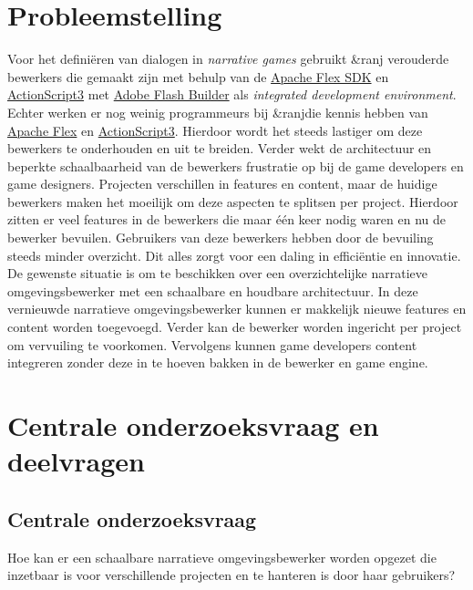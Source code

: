\documentclass{report}
\newcommand{\organisation}{\&ranj}
\begin{document}
\section{Probleemstelling}
Voor het defini{\"e}ren van dialogen in \emph{narrative games} gebruikt \organisation{} verouderde bewerkers die gemaakt zijn met behulp van de \href{https://en.wikipedia.org/wiki/Apache_Flex}{Apache Flex SDK} en \href{http://www.adobe.com/devnet/actionscript/articles/actionscript3_overview.html}{ActionScript3} met \href{https://en.wikipedia.org/wiki/Adobe_Flash_Builder}{Adobe Flash Builder} als \emph{integrated development environment}. Echter werken er nog weinig programmeurs bij \organisation die kennis hebben van \href{https://en.wikipedia.org/wiki/Apache_Flex}{Apache Flex} en \href{http://www.adobe.com/devnet/actionscript/articles/actionscript3_overview.html}{ActionScript3}. Hierdoor wordt het steeds lastiger om deze bewerkers te onderhouden en uit te breiden. Verder wekt de architectuur en beperkte schaalbaarheid van de bewerkers frustratie op bij de game developers en game designers. Projecten verschillen in features en content, maar de huidige bewerkers maken het moeilijk om deze aspecten te splitsen per project. Hierdoor zitten er veel features in de bewerkers die maar {\'e}{\'e}n keer nodig waren en nu de bewerker bevuilen. Gebruikers van deze bewerkers hebben door de bevuiling steeds minder overzicht. Dit alles zorgt voor een daling in effici{\"e}ntie en innovatie.
De gewenste situatie is om te beschikken over een overzichtelijke narratieve omgevingsbewerker met een schaalbare en houdbare architectuur. In deze vernieuwde narratieve omgevingsbewerker kunnen er makkelijk nieuwe features en content worden toegevoegd. Verder kan de bewerker worden ingericht per project om vervuiling te voorkomen. Vervolgens kunnen game developers content integreren zonder deze in te hoeven bakken in de bewerker en game engine.

\section{Centrale onderzoeksvraag en deelvragen}
\subsection{Centrale onderzoeksvraag}
Hoe kan er een schaalbare narratieve omgevingsbewerker worden opgezet die inzetbaar is voor verschillende projecten en te hanteren is door haar gebruikers?
\end{document}
